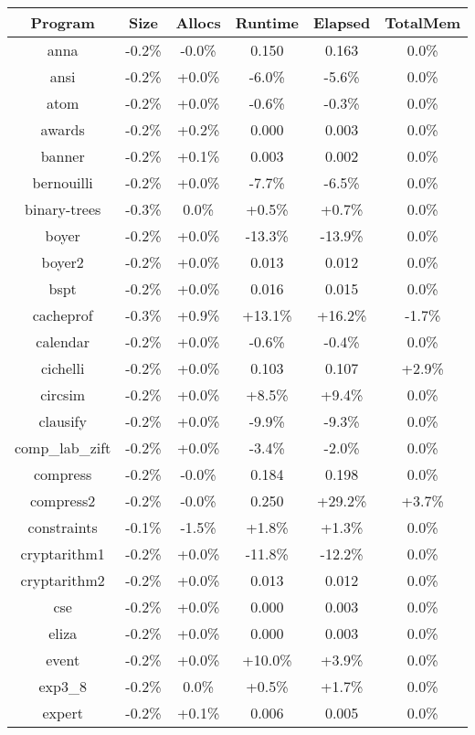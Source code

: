 \begin{tabular}{ c c c c c c }
Program & Size & Allocs & Runtime & Elapsed & TotalMem\\
\hline
anna & -0.2\% & -0.0\% & 0.150 & 0.163 &  0.0\%\\
ansi & -0.2\% & +0.0\% & -6.0\% & -5.6\% &  0.0\%\\
atom & -0.2\% & +0.0\% & -0.6\% & -0.3\% &  0.0\%\\
awards & -0.2\% & +0.2\% & 0.000 & 0.003 &  0.0\%\\
banner & -0.2\% & +0.1\% & 0.003 & 0.002 &  0.0\%\\
bernouilli & -0.2\% & +0.0\% & -7.7\% & -6.5\% &  0.0\%\\
binary-trees & -0.3\% &  0.0\% & +0.5\% & +0.7\% &  0.0\%\\
boyer & -0.2\% & +0.0\% & -13.3\% & -13.9\% &  0.0\%\\
boyer2 & -0.2\% & +0.0\% & 0.013 & 0.012 &  0.0\%\\
bspt & -0.2\% & +0.0\% & 0.016 & 0.015 &  0.0\%\\
cacheprof & -0.3\% & +0.9\% & +13.1\% & +16.2\% & -1.7\%\\
calendar & -0.2\% & +0.0\% & -0.6\% & -0.4\% &  0.0\%\\
cichelli & -0.2\% & +0.0\% & 0.103 & 0.107 & +2.9\%\\
circsim & -0.2\% & +0.0\% & +8.5\% & +9.4\% &  0.0\%\\
clausify & -0.2\% & +0.0\% & -9.9\% & -9.3\% &  0.0\%\\
comp\_lab\_zift & -0.2\% & +0.0\% & -3.4\% & -2.0\% &  0.0\%\\
compress & -0.2\% & -0.0\% & 0.184 & 0.198 &  0.0\%\\
compress2 & -0.2\% & -0.0\% & 0.250 & +29.2\% & +3.7\%\\
constraints & -0.1\% & -1.5\% & +1.8\% & +1.3\% &  0.0\%\\
cryptarithm1 & -0.2\% & +0.0\% & -11.8\% & -12.2\% &  0.0\%\\
cryptarithm2 & -0.2\% & +0.0\% & 0.013 & 0.012 &  0.0\%\\
cse & -0.2\% & +0.0\% & 0.000 & 0.003 &  0.0\%\\
eliza & -0.2\% & +0.0\% & 0.000 & 0.003 &  0.0\%\\
event & -0.2\% & +0.0\% & +10.0\% & +3.9\% &  0.0\%\\
exp3\_8 & -0.2\% &  0.0\% & +0.5\% & +1.7\% &  0.0\%\\
expert & -0.2\% & +0.1\% & 0.006 & 0.005 &  0.0\%\\

\end{tabular}

